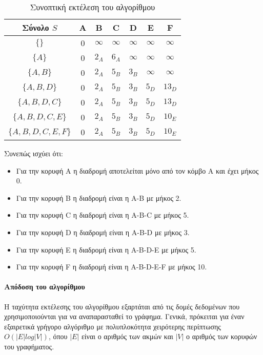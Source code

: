 \begin{table}[ht]
	\centering
	\label{tbl:dijkstra2}
	\begin{tabular}{|c|c|c|c|c|c|c|}
		\hline
		Σύνολο $S$  & A & B        & C        & D        & E        & F        \\ \hline
		$\{\}$            & 0 & $\infty$     & $\infty$ & $\infty$ & $\infty$ & $\infty$ \\ \hline
		$\{A\}$           & 0 & $2_A$        & $6_A$        & $\infty$ & $\infty$ & $\infty$ \\ \hline
		$\{A,B\}$         & 0 & $2_A$        & $5_B$        & $3_B$        & $\infty$ & $\infty$ \\ \hline
		$\{A,B,D\}$       & 0 & $2_A$        & $5_B$        & $3_B$        & $5_D$        & $13_D$       \\ \hline
		$\{A,B,D,C\}$     & 0 & $2_A$        & $5_B$        & $3_B$        & $5_D$        & $13_D$       \\ \hline
		$\{A,B,D,C,E\}$   & 0 & $2_A$        & $5_B$        & $3_B$        & $5_D$        & $10_E$       \\ \hline
		$\{A,B,D,C,E,F\}$ & 0 & $2_A$        & $5_B$        & $3_B$        & $5_D$        & $10_E$       \\ \hline
	\end{tabular}
	\caption{Συνοπτική εκτέλεση του αλγορίθμου}
\end{table}

Συνεπώς ισχύει ότι: 
\begin{itemize}[noitemsep]
	\item Για την κορυφή A η διαδρομή αποτελείται μόνο από τον κόμβο A και έχει μήκος 0.
	\item Για την κορυφή B η διαδρομή είναι η A-B με μήκος 2.
	\item Για την κορυφή C η διαδρομή είναι η A-B-C με μήκος 5.
	\item Για την κορυφή D η διαδρομή είναι η A-B-D με μήκος 3.
	\item Για την κορυφή E η διαδρομή είναι η A-B-D-E με μήκος 5.
	\item Για την κορυφή F η διαδρομή είναι η A-B-D-E-F με μήκος 10.
\end{itemize}

\paragraph{Απόδοση του αλγορίθμου}

Η ταχύτητα εκτέλεσης του αλγορίθμου εξαρτάται από τις δομές δεδομένων που χρησιμοποιούνται για να αναπαρασταθεί το γράφημα. Γενικά, πρόκειται για έναν εξαιρετικά γρήγορο αλγόριθμο με πολυπλοκότητα χειρότερης περίπτωσης $O(|E| log |V|)$, όπου $|E|$ είναι ο αριθμός των ακμών και $|V|$ ο αριθμός των κορυφών του γραφήματος.

